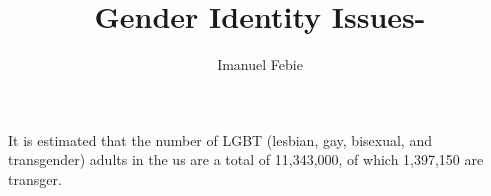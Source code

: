 \documentclass[12pt]{article}
\begin{document}
\title{Gender Identity Issues-}
\author{Imanuel Febie}
\maketitle

It is estimated that the number of LGBT (lesbian, gay, bisexual, and transgender) adults in the us are a total of 11,343,000, of which 1,397,150 are transger.
 

 

 

 

 


 


\end{document}
